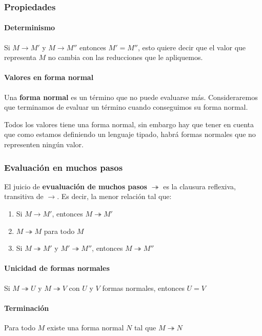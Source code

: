 \subsubsection{Propiedades}

\paragraph{Determinismo} Si $M\to M'$ y $M\to M''$ entonces $M' = M''$, esto quiere decir que el valor que representa $M$ no cambia con las reducciones que le apliquemos.

\paragraph{Valores en forma normal} Una \textbf{forma normal} es un término que no puede evaluarse más. Consideraremos que terminamos de evaluar un término cuando conseguimos su forma normal.

Todos los valores tiene una forma normal, sin embargo hay que tener en cuenta que como estamos definiendo un lenguaje tipado, habrá formas normales que no representen ningún valor.

\subsubsection{Evaluación en muchos pasos}
El juicio de \textbf{evualuación de muchos pasos} $\twoheadrightarrow$ es la clausura reflexiva, transitiva de $\to$. Es decir, la menor relación tal que:
\begin{enumerate}
    \item Si $M\to M'$, entonces $M\twoheadrightarrow M'$
    \item $M\twoheadrightarrow M$ para todo $M$
    \item Si $M\twoheadrightarrow M'$ y $M' \twoheadrightarrow M''$, entonces $M\twoheadrightarrow M''$
\end{enumerate}

\paragraph{Unicidad de formas normales} Si $M\twoheadrightarrow U$ y $M\twoheadrightarrow V$ con $U$ y $V$ formas normales, entonces $U = V$

\paragraph{Terminación}
Para todo $M$ existe una forma normal $N$ tal que $M\twoheadrightarrow N$


